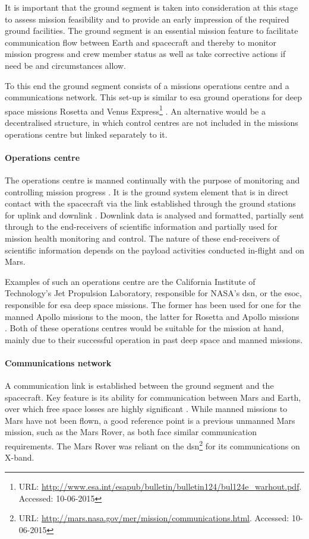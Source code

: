 It is important that the ground segment is taken into consideration at this stage to assess mission feasibility and to provide an early impression of the required ground facilities. The ground segment is an essential mission feature to facilitate communication flow between Earth and spacecraft and thereby to monitor mission progress and crew member status as well as take corrective actions if need be and circumstances allow.

To this end the ground segment consists of a missions operations centre and a communications network. This set-up is similar to \gls{esa} ground operations for deep space missions Rosetta and Venus Express\footnote{URL: \url{http://www.esa.int/esapub/bulletin/bulletin124/bul124e_warhout.pdf}. Accessed: 10-06-2015}  \cite{Warhaut2007}. An alternative would be a decentralised structure, in which control centres are not included in the missions operations centre but linked separately to it. 

\paragraph{Operations centre}
The operations centre is manned continually with the purpose of monitoring and controlling mission progress \cite{Warhaut2007}. It is the ground system element that is in direct contact with the spacecraft via the link established through the ground stations for uplink and downlink \cite[p.879]{Wertz2011}. Downlink data is analysed and formatted, partially sent through to the end-receivers of scientific information and partially used for mission health monitoring and control. The nature of these end-receivers of scientific information depends on the payload activities conducted in-flight and on Mars. 

Examples of such an operations centre are the California Institute of Technology's Jet Propulsion Laboratory, responsible for NASA's \gls{dsn}, or the \gls{esoc}, responsible for \gls{esa} deep space missions. The former has been used for one for the manned Apollo missions to the moon, the latter for Rosetta and Apollo missions \cite{Wertz2011,Warhaut2007}. Both of these operations centres would be suitable for the mission at hand, mainly due to their successful operation in past deep space and manned missions. 

\paragraph{Communications network}
A communication link is established between the ground segment and the spacecraft. Key feature is its ability for communication between Mars and Earth, over which free space losses are highly significant \cite{Wertz2011}. While manned missions to Mars have not been flown, a good reference point is a previous unmanned Mars mission, such as the Mars Rover, as both face similar communication requirements. The Mars Rover was reliant on the \gls{dsn}\footnote{URL: \url{http://mars.nasa.gov/mer/mission/communications.html}. Accessed: 10-06-2015} for its communications on X-band. 

